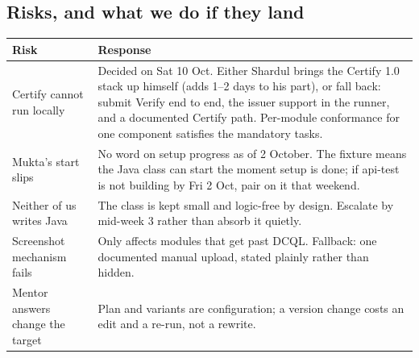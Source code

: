 \documentclass[10pt,a4paper]{article}
\begin{document}
\subsection{Risks, and what we do if they land}

\begin{longtable}{@{}p{5.4cm}p{11cm}@{}}
\toprule
Risk & Response\\
\midrule
\endhead
Certify cannot run locally & Decided on Sat 10 Oct. Either Shardul brings the Certify 1.0 stack up himself (adds 1--2 days to his part), or fall back: submit Verify end to
end, the issuer support in the runner, and a documented Certify path. Per-module
conformance for one component satisfies the mandatory tasks.\\
Mukta's start slips & No word on setup progress as of 2 October. The fixture means the Java
class can start the moment setup is done; if api-test is not building by Fri 2 Oct, pair
on it that weekend.\\
Neither of us writes Java & The class is kept small and logic-free by design. Escalate by
mid-week 3 rather than absorb it quietly.\\
Screenshot mechanism fails & Only affects modules that get past DCQL. Fallback: one
documented manual upload, stated plainly rather than hidden.\\
Mentor answers change the target & Plan and variants are configuration; a version change
costs an edit and a re-run, not a rewrite.\\
\bottomrule
\end{longtable}
\end{document}
